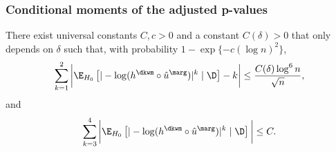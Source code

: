 \subsubsection{Conditional moments of the adjusted p-values}
\begin{lemma}\label{lem:cond_moments_dkwm}
  There exist universal constants $C, c > 0$ and a constant $C(\delta) > 0$ that only depends on $\delta$ such that, with probability $1 - \exp\{-c(\log n)^2\}$,
  \begin{equation*}
    \sum_{k=1}^{2}\bigg|\E_{H_0}\left[|-\log (h^\dkwm \circ \hat{u}^\marg)|^k\mid \D\right] - k\bigg| \le \frac{C(\delta)\log^6 n}{\sqrt{n}},
  \end{equation*}
  and
  \begin{equation*}
    \sum_{k=3}^{4}\bigg|\E_{H_0}\left[|-\log (h^\dkwm \circ \hat{u}^\marg)|^k\mid \D\right]\bigg|\le C.
  \end{equation*}
\end{lemma}
